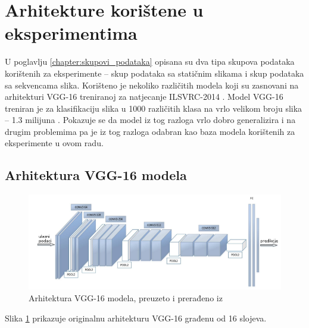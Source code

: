 \documentclass[times, utf8, diplomski, numeric]{fer}
\begin{document}
\section{Arhitekture korištene u eksperimentima}
U poglavlju \ref{chapter:skupovi_podataka} opisana su dva tipa skupova podataka korištenih za eksperimente -- skup podataka sa statičnim slikama i skup podataka sa sekvencama slika.
Korišteno je nekoliko različitih modela koji su zasnovani na arhitekturi VGG-16 \citep{article:vgg} treniranoj za natjecanje ILSVRC-2014 \citep{article:ilsvrc2015}.
Model VGG-16 treniran je za klasifikaciju slika u 1000 različitih klasa na vrlo velikom broju slika -- 1.3 milijuna \citep{article:vgg}.
Pokazuje se da model iz tog razloga vrlo dobro generalizira i na drugim problemima \citep{article:vgg} pa je iz tog razloga odabran kao baza modela korištenih za eksperimente u ovom radu.

\subsection{Arhitektura VGG-16 modela}
\begin{figure}[H]
\centering
\includegraphics[scale=0.65]{images/vgg_architecture.png}
\caption{Arhitektura VGG-16 modela, preuzeto i prerađeno iz \citep{article:vgg_architecture}}
\label{img:vgg_architecture}
\end{figure}
Slika \ref{img:vgg_architecture} prikazuje originalnu arhitekturu VGG-16 građenu od 16 slojeva.
\end{document}
